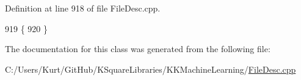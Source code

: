 Definition at line 918 of file File\+Desc.\+cpp.


\begin{DoxyCode}
919 \{
920 \}
\end{DoxyCode}


The documentation for this class was generated from the following file\+:\begin{DoxyCompactItemize}
\item 
C\+:/\+Users/\+Kurt/\+Git\+Hub/\+K\+Square\+Libraries/\+K\+K\+Machine\+Learning/\hyperlink{_file_desc_8cpp}{File\+Desc.\+cpp}\end{DoxyCompactItemize}
